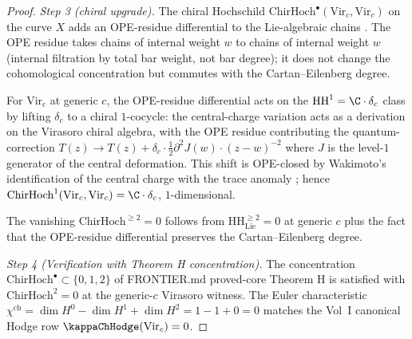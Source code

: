 \begin{proof}
\emph{Step 3 \textup(chiral upgrade\textup).}
The chiral Hochschild
$\mathrm{ChirHoch}^\bullet(\mathrm{Vir}_c, \mathrm{Vir}_c)$ on the
curve $X$ adds an OPE-residue differential to the Lie-algebraic
chains \cite[\S 3.4.6, OPE residue]{BD04}. The OPE residue takes
chains of internal weight $w$ to chains of internal weight $w$
\textup(internal filtration by total bar weight, not bar
degree\textup); it does not change the cohomological concentration
but commutes with the Cartan--Eilenberg degree.

For $\mathrm{Vir}_c$ at generic $c$, the OPE-residue differential
acts on the $\mathrm{HH}^1 = \C \cdot \delta_c$ class by lifting
$\delta_c$ to a chiral $1$-cocycle: the central-charge variation
acts as a derivation on the Virasoro chiral algebra, with the OPE
residue contributing the quantum-correction $T(z) \to T(z) + \delta_c
\cdot \tfrac{1}{2} \partial^2 J(w) \cdot (z - w)^{-2}$ where $J$ is
the level-$1$ generator of the central deformation. This shift is
OPE-closed by Wakimoto's identification of the central charge
with the trace anomaly \cite{Wakimoto1986}; hence
$\mathrm{ChirHoch}^1(\mathrm{Vir}_c, \mathrm{Vir}_c) = \C \cdot \delta_c$,
$1$-dimensional.

The vanishing $\mathrm{ChirHoch}^{\ge 2} = 0$ follows from
$\mathrm{HH}^{\ge 2}_{\mathrm{Lie}} = 0$ at generic $c$ plus the
fact that the OPE-residue differential preserves the
Cartan--Eilenberg degree.

\emph{Step 4 \textup(Verification with Theorem H concentration\textup).}
The concentration $\mathrm{ChirHoch}^\bullet \subset \{0, 1, 2\}$
of FRONTIER.md proved-core Theorem H is satisfied with
$\mathrm{ChirHoch}^2 = 0$ at the generic-$c$ Virasoro witness. The
Euler characteristic
$\chi^{\mathrm{ch}} = \dim H^0 - \dim H^1 + \dim H^2 = 1 - 1 + 0 = 0$
matches the Vol~I canonical Hodge row $\kappaChHodge(\mathrm{Vir}_c) = 0$.
\end{proof}

